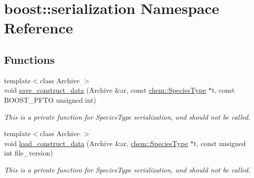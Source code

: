 \hypertarget{namespaceboost_1_1serialization}{\section{boost\-:\-:serialization Namespace Reference}
\label{namespaceboost_1_1serialization}
}
\subsection*{Functions}
\begin{DoxyCompactItemize}
\item 
{\footnotesize template$<$class Archive $>$ }\\void \hyperlink{namespaceboost_1_1serialization_aa8807ad5d1bae98628312af06ce44a7f}{save\-\_\-construct\-\_\-data} (Archive \&ar, const \hyperlink{classchem_1_1SpeciesType}{chem\-::\-Species\-Type} $\ast$t, const B\-O\-O\-S\-T\-\_\-\-P\-F\-T\-O unsigned int)
\begin{DoxyCompactList}\small\item\em This is a private function for Species\-Type serialization, and should not be called. \end{DoxyCompactList}\item 
{\footnotesize template$<$class Archive $>$ }\\void \hyperlink{namespaceboost_1_1serialization_aac84904f93090404594e83de0c3f2943}{load\-\_\-construct\-\_\-data} (Archive \&ar, \hyperlink{classchem_1_1SpeciesType}{chem\-::\-Species\-Type} $\ast$t, const unsigned int file\-\_\-version)
\begin{DoxyCompactList}\small\item\em This is a private function for Species\-Type serialization, and should not be called. \end{DoxyCompactList}\end{DoxyCompactItemize}


